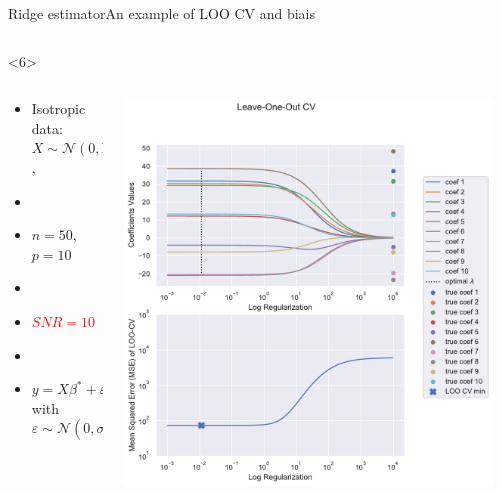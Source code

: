 \documentclass[10pt,aspectratio=43]{beamer}
\begin{document}
\begin{frame}{Ridge estimator}{An example of LOO CV and biais}
\begin{onlyenv}
\begin{columns}
\begin{column}{0.7\textwidth}
\begin{center}
                 \end{center}
            \end{column}
            \end{columns}
    \end{onlyenv}
    \begin{onlyenv}<6>
        \begin{columns}
            \begin{column}{0.4\textwidth}
                \begin{itemize}
                    \item Isotropic data: $X\sim\mathcal{N}(0,\mathrm{Id})$,
                    \item[]
                    \item $n=50$, $p=10$
                    \item[]
                    \item \textcolor{red}{$SNR=10$}
                    \item[]
                    \item $y = X\beta^*+\varepsilon$ with $\varepsilon\sim \mathcal{N}(0, \sigma^2\mathrm{Id})$
                \end{itemize}
            \end{column}
            \begin{column}{0.7\textwidth}
                \begin{center}
                        \includegraphics[width=0.95\textwidth]{path_ridge_complete_10_.pdf}
                 \end{center}
            \end{column}
            \end{columns}
    \end{onlyenv}
\end{frame}
\end{document}
